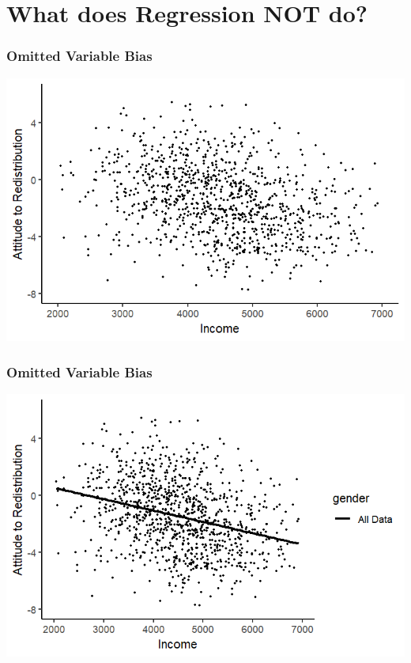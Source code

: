\documentclass[xcolor=x11names,compress]{beamer}\usepackage[]{graphicx}\usepackage[]{color}
\makeatletter
\def\maxwidth{ %
  \ifdim\Gin@nat@width>\linewidth
    \linewidth
  \else
    \Gin@nat@width
  \fi
}
\newenvironment{knitrout}{}{} %
\renewcommand{\(}{\begin{columns}}
\renewcommand{\)}{\end{columns}}
\newcommand{\<}[1]{\begin{column}{#1}}
\renewcommand{\>}{\end{column}}
\makeatother
\begin{document}
\begin{frame}
\begin{multicols}{2}
\begin{knitrout}
\end{knitrout}
\end{multicols}
\end{frame}

\section{What does Regression NOT do?}

\begin{frame}
\frametitle{Omitted Variable Bias}
\begin{knitrout}
\color{fgcolor}
\includegraphics[width=\maxwidth]{figure/confound3b-1} 

\end{knitrout}
\end{frame}

\begin{frame}
\frametitle{Omitted Variable Bias}
\begin{knitrout}
\color{fgcolor}
\includegraphics[width=\maxwidth]{figure/confound3c-1} 

\end{knitrout}
\end{frame}
\end{document}
